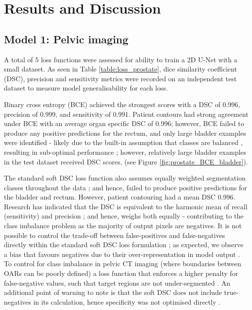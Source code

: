 \chapter{Results and Discussion}
\label{ch:results}

\section{Model 1: Pelvic imaging}
A total of 5 loss functions were assessed for ability to train a 2D U-Net with a small dataset. As seen in Table \ref{table:loss_prostate}, dice similarity coefficient (DSC), precision and sensitivity metrics were recorded on an independent test dataset to measure model generalisability for each loss. 

Binary cross entropy (BCE) achieved the strongest scores with a DSC of 0.996, precision of 0.999, and sensitivity of 0.991. Patient contours had strong agreement under BCE with an average organ specific DSC of 0.996; however, BCE failed to produce any positive predictions for the rectum, and only large bladder examples were identified - likely due to the built-in assumption that classes are balanced \cite{Ronneberger_2015}, resulting in sub-optimal performance \cite{taghanaki2018}; however, relatively large bladder examples in the test dataset received DSC scores. \todo{}(see Figure \ref{fig:prostate_BCE_bladder}).  

The standard soft DSC loss function also assumes equally weighted segmentation classes throughout the data \cite{Sudre_2017}; and hence, failed to produce positive predictions for the bladder and rectum. However, patient contouring had a mean DSC 0.996. Research has indicated that the DSC is equivalent to the harmonic mean of recall (sensitivity) and precision \cite{Bebis2019}; and hence, weighs both equally \cite{Bebis2019} - contributing to the class imbalance problem as the majority of output pixels are negatives. It is not possible to control the trade-off between false-positives and false-negatives directly within the standard soft DSC loss formulation \cite{taghanaki2018};
as expected, we observe a bias that favours negatives due to their over-representation in model output \cite{taghanaki2018}. To control for class imbalance in pelvic CT imaging (where boundaries between OARs can be poorly defined) a loss function that enforces a higher penalty for false-negative values, such that target regions are not under-segmented \cite{taghanaki2018}. An additional point of warning to note is that the soft DSC does not include true-negatives in its calculation, hence specificity was not optimised directly \cite{taghanaki2018}.

